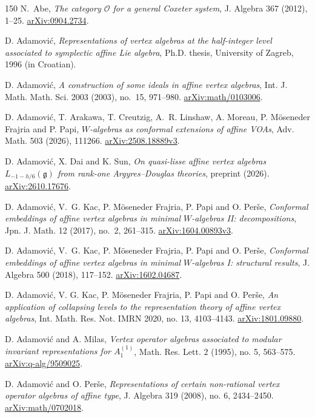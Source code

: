 \documentclass[11pt,a4paper]{amsart}
\numberwithin{equation}{section}
\theoremstyle{definition}
\theoremstyle{remark}
\newcommand{\arxiv}[1]{\href{https://arxiv.org/abs/#1}{arXiv:#1}}
\begin{document}
\begin{thebibliography}{150}
 N.~Abe,
\emph{The category $\mathcal O$ for a general Coxeter system},
J. Algebra 367 (2012), 1--25.
\arxiv{0904.2734}.

 D. Adamovi\'c,
\emph{Representations of vertex algebras at the half-integer level associated to symplectic affine Lie algebra},
Ph.D. thesis, University of Zagreb, 1996 (in Croatian).

 D. Adamovi\'{c},
\emph{A construction of some ideals in affine vertex algebras},
Int. J. Math. Math. Sci. 2003 (2003), no.~15, 971--980. \arxiv{math/0103006}.

 D. Adamovi\'c, T. Arakawa, T. Creutzig, A.~R. Linshaw, A. Moreau, P. M\"oseneder Frajria and P. Papi,
\emph{$W$-algebras as conformal extensions of affine VOAs},
Adv. Math. 503 (2026), 111266. \arxiv{2508.18889v3}.

 D. Adamovi\'{c}, X. Dai and K. Sun,
\emph{On quasi-lisse affine vertex algebras $L_{-1-h/6}(\mathfrak g)$ from rank-one Argyres--Douglas theories},
preprint (2026). \arxiv{2610.17676}.

 D. Adamovi\'{c}, V.~G. Kac, P. M\"oseneder Frajria, P. Papi and O. Per\v{s}e,
\emph{Conformal embeddings of affine vertex algebras in minimal $W$-algebras II: decompositions},
Jpn. J. Math. 12 (2017), no.~2, 261--315. \arxiv{1604.00893v3}.

 D. Adamovi\'{c}, V.~G. Kac, P. M\"oseneder Frajria, P. Papi and O. Per\v{s}e,
\emph{Conformal embeddings of affine vertex algebras in minimal $W$-algebras I: structural results},
J. Algebra 500 (2018), 117--152. \arxiv{1602.04687}.

 D. Adamovi\'c, V. G. Kac, P. M\"oseneder Frajria, P. Papi and O. Per\v se,
\emph{An application of collapsing levels to the representation theory of affine vertex algebras},
Int. Math. Res. Not. IMRN 2020, no. 13, 4103--4143. \arxiv{1801.09880}.

 D. Adamovi\'c and A. Milas,
\emph{Vertex operator algebras associated to modular invariant representations for $A_1^{(1)}$},
Math. Res. Lett. 2 (1995), no. 5, 563--575. \arxiv{q-alg/9509025}.

 D. Adamovi\'c and O. Per\v se,
\emph{Representations of certain non-rational vertex operator algebras of affine type},
J. Algebra 319 (2008), no. 6, 2434--2450. \arxiv{math/0702018}.


\end{thebibliography}
\end{document}
